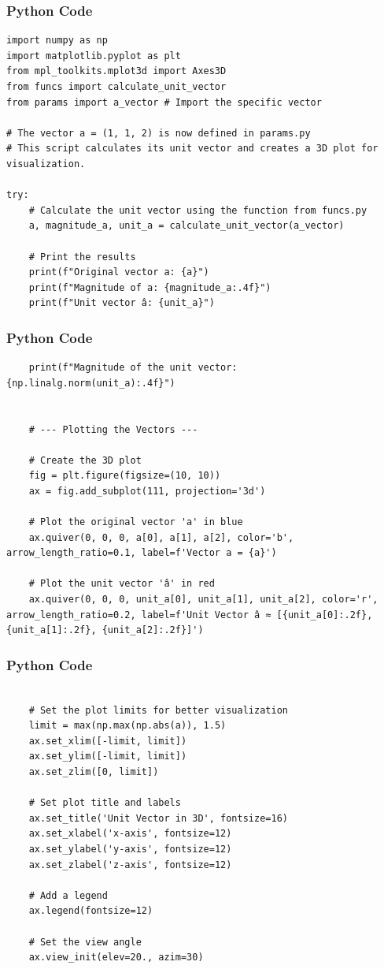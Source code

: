 \documentclass{beamer}
\begin{document}
\begin{frame}[fragile]
\frametitle{Python Code}
\begin{lstlisting}
import numpy as np
import matplotlib.pyplot as plt
from mpl_toolkits.mplot3d import Axes3D
from funcs import calculate_unit_vector
from params import a_vector # Import the specific vector

# The vector a = (1, 1, 2) is now defined in params.py
# This script calculates its unit vector and creates a 3D plot for visualization.

try:
    # Calculate the unit vector using the function from funcs.py
    a, magnitude_a, unit_a = calculate_unit_vector(a_vector)

    # Print the results
    print(f"Original vector a: {a}")
    print(f"Magnitude of a: {magnitude_a:.4f}")
    print(f"Unit vector â: {unit_a}")
    \end{lstlisting}
\end{frame}

\begin{frame}[fragile]
\frametitle{Python Code}
\begin{lstlisting}
    print(f"Magnitude of the unit vector: {np.linalg.norm(unit_a):.4f}")


    # --- Plotting the Vectors ---

    # Create the 3D plot
    fig = plt.figure(figsize=(10, 10))
    ax = fig.add_subplot(111, projection='3d')

    # Plot the original vector 'a' in blue
    ax.quiver(0, 0, 0, a[0], a[1], a[2], color='b', arrow_length_ratio=0.1, label=f'Vector a = {a}')

    # Plot the unit vector 'â' in red
    ax.quiver(0, 0, 0, unit_a[0], unit_a[1], unit_a[2], color='r', arrow_length_ratio=0.2, label=f'Unit Vector â ≈ [{unit_a[0]:.2f}, {unit_a[1]:.2f}, {unit_a[2]:.2f}]')
    \end{lstlisting}
\end{frame}

\begin{frame}[fragile]
\frametitle{Python Code}
\begin{lstlisting}

    # Set the plot limits for better visualization
    limit = max(np.max(np.abs(a)), 1.5)
    ax.set_xlim([-limit, limit])
    ax.set_ylim([-limit, limit])
    ax.set_zlim([0, limit])

    # Set plot title and labels
    ax.set_title('Unit Vector in 3D', fontsize=16)
    ax.set_xlabel('x-axis', fontsize=12)
    ax.set_ylabel('y-axis', fontsize=12)
    ax.set_zlabel('z-axis', fontsize=12)

    # Add a legend
    ax.legend(fontsize=12)

    # Set the view angle
    ax.view_init(elev=20., azim=30)
    \end{lstlisting}
\end{frame}
\end{document}
